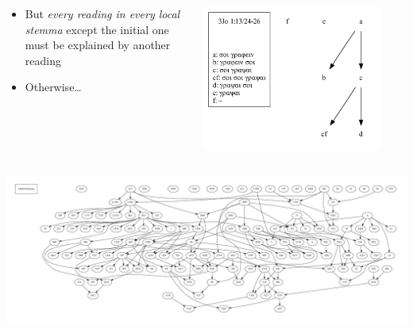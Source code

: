 \documentclass[10pt]{beamer}
\begin{document}
	\begin{frame}
		\begin{columns}
			\begin{column}{0.45\textwidth}
				\begin{itemize}
					\item But \emph{every reading in every local stemma} except the initial one must be explained by another reading
					\item Otherwise…
				\end{itemize}
			\end{column}
			\begin{column}{0.45\textwidth}
				\begin{center}
					\includegraphics[width=0.875\textwidth]{../img/B25K1V13U24-26-local-stemma-incomplete.pdf}
				\end{center}	
			\end{column}
		\end{columns}
		\begin{center}
			\includegraphics[width=\textwidth]{../img/global-stemma-incomplete.pdf}
		\end{center}	
	\end{frame}
\end{document}
